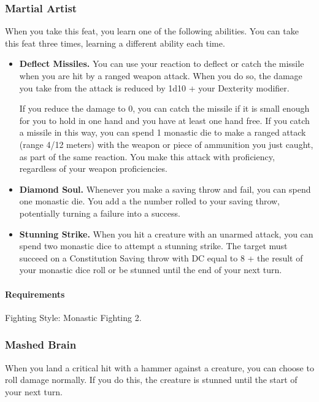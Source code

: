 \subsubsection{Martial Artist} \label{feat::martialartist}
    When you take this feat, you learn one of the following abilities.
    You can take this feat three times, learning a different ability each time.
    \begin{itemize}
        \item \textbf{Deflect Missiles.} You can use your reaction to deflect or catch the missile when you are hit by a ranged weapon attack.
        When you do so, the damage you take from the attack is reduced by 1d10 + your Dexterity modifier.

        If you reduce the damage to 0, you can catch the missile if it is small enough for you to hold in one hand and you have at least one hand free.
        If you catch a missile in this way, you can spend 1 monastic die to make a ranged attack (range 4/12 meters) with the weapon or piece of ammunition you just caught, as part of the same reaction.
        You make this attack with proficiency, regardless of your weapon proficiencies.

        \item \textbf{Diamond Soul.} Whenever you make a saving throw and fail, you can spend one monastic die.
        You add a the number rolled to your saving throw, potentially turning a failure into a success.

        \item \textbf{Stunning Strike.} When you hit a creature with an unarmed attack, you can spend two monastic dice to attempt a stunning strike.
        The target must succeed on a Constitution Saving throw with DC equal to 8 + the result of your monastic dice roll or be stunned until the end of your next turn.
    \end{itemize}

    \paragraph{Requirements} Fighting Style: Monastic Fighting 2.
\subsubsection{Mashed Brain} \label{feat::mashedbrain}
    When you land a critical hit with a hammer against a creature, you can choose to roll damage normally.
    If you do this, the creature is stunned until the start of your next turn.
